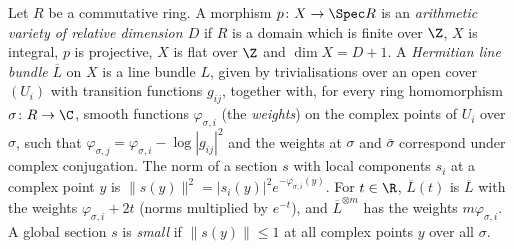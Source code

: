 \begin{definition}\label{pf:covol:def:hermlb}
Let $R$ be a commutative ring. A morphism $p\colon X\to\Spec R$ is an \emph{arithmetic variety of
relative dimension $D$} if $R$ is a domain which is finite over $\Z$, $X$ is integral, $p$ is
projective, $X$ is flat over $\Z$ and $\dim X=D+1$. A \emph{Hermitian line bundle} $\overline L$ on
$X$ is a line bundle $L$, given by trivialisations over an open cover $(U_i)$ with transition functions
$g_{ij}$, together with, for every ring homomorphism $\sigma\colon R\to\C$, smooth functions
$\varphi_{\sigma,i}$ (the \emph{weights}) on the complex points of $U_i$ over $\sigma$, such that
$\varphi_{\sigma,j}=\varphi_{\sigma,i}-\log|g_{ij}|^2$ and the weights at $\sigma$ and $\bar\sigma$
correspond under complex conjugation. The norm of a section $s$ with local components $s_i$ at a complex
point $y$ is $\|s(y)\|^2=|s_i(y)|^2e^{-\varphi_{\sigma,i}(y)}$. For $t\in\R$, $\overline L(t)$ is
$\overline L$ with the weights $\varphi_{\sigma,i}+2t$ (norms multiplied by $e^{-t}$), and
$\overline L^{\otimes m}$ has the weights $m\varphi_{\sigma,i}$. A global section $s$ is \emph{small} if
$\|s(y)\|\le1$ at all complex points $y$ over all $\sigma$.
\end{definition}

